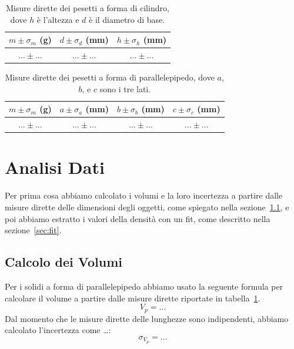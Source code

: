 \documentclass[a4paper]{article}
\begin{document}
\begin{table}[]
    \centering
    \begin{tabular}{c|c|c}
      $m\pm \sigma_m$ (g)   & $d\pm\sigma_d$ (mm)  & $h\pm\sigma_h$ (mm)\\
      \hline
     $\ldots \pm \ldots$    & $\ldots \pm \ldots$ &$\ldots \pm \ldots$\\
    \end{tabular}
    \caption{Misure dirette dei pesetti a forma di cilindro, dove $h$ \`e l'altezza e $d$ \`e il diametro di base.}
    \label{tab:dir_cilindri}
\end{table}

\begin{table}[]
    \centering
    \begin{tabular}{c|c|c|c}
      $m\pm \sigma_m$ (g)   & $a\pm\sigma_a$ (mm)  & $b\pm\sigma_b$ (mm)& $c\pm\sigma_c$ (mm)\\
      \hline
       $\ldots \pm \ldots$  & $\ldots \pm \ldots$ & $\ldots \pm \ldots$ & $\ldots \pm \ldots$\\
    \end{tabular}
    \caption{Misure dirette dei pesetti a forma di parallelepipedo, dove $a$, $b$, e $c$ sono i tre lati.}
    \label{tab:dir_parallelepipedi}
\end{table}


\section{Analisi Dati}
Per prima cosa abbiamo calcolato i volumi e la loro incertezza a partire dalle misure dirette delle dimensioni degli oggetti,
come spiegato nella sezione~\ref{sec:calcoloV}, e poi abbiamo estratto i valori della densit\`a con un fit,
come descritto nella sezione~\ref{sec:fit}.

\subsection{Calcolo dei Volumi}\label{sec:calcoloV}
Per i solidi a forma di parallelepipedo abbiamo usato la seguente formula per calcolare il volume a partire dalle misure dirette riportate in tabella~\ref{tab:dir_cilindri}.
\begin{equation}
    V_p = \ldots
\end{equation}
Dal momento che le misure dirette delle lunghezze sono indipendenti, abbiamo calcolato l'incertezza come \ldots:
\begin{equation}
    \sigma_{V_p} = \ldots
\end{equation}
\end{document}
